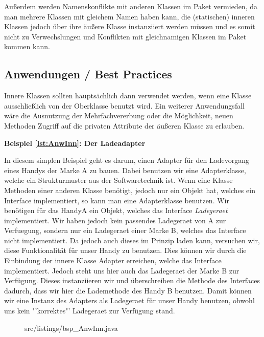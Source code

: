 Außerdem werden Namenskonflikte mit anderen Klassen im Paket vermieden, da man mehrere Klassen mit gleichem Namen haben kann,
die (statischen) inneren Klassen jedoch über ihre äußere Klasse instanziiert werden müssen und es somit nicht zu Verwechslungen und Konflikten mit gleichnamigen Klassen im Paket kommen kann.

\subsection{Anwendungen / Best Practices}

Innere Klassen sollten hauptsächlich dann verwendet werden, wenn eine Klasse ausschließlich von der Oberklasse benutzt wird.
Ein weiterer Anwendungsfall wäre die Ausnutzung der Mehrfachvererbung oder die Möglichkeit, neuen Methoden Zugriff auf die privaten Attribute der äußeren Klasse zu erlauben.

{\bf Beispiel \ref{lst:AnwInn}: Der Ladeadapter}

In diesem simplen Beispiel geht es darum, einen Adapter für den Ladevorgang eines Handys der Marke A zu bauen. Dabei benutzen wir eine Adapterklasse, welche ein Strukturmuster aus der Softwaretechnik ist. Wenn eine Klasse Methoden einer anderen Klasse benötigt, jedoch nur ein Objekt hat, welches ein Interface implementiert, so kann man eine Adapterklasse benutzen.
Wir benötigen für das HandyA ein Objekt, welches das Interface {\it Ladegeraet} implementiert.
Wir haben jedoch kein passendes Ladegeraet von A zur Verfuegung, sondern nur ein Ladegeraet einer Marke B, welches das Interface nicht implementiert.
Da jedoch auch dieses im Prinzip laden kann, versuchen wir, diese Funktionalität für unser Handy zu benutzen.
Dies können wir durch die Einbindung der innere Klasse Adapter erreichen, welche das Interface implementiert.
Jedoch steht uns hier auch das Ladegeraet der Marke B zur Verfügung.
Dieses instanziieren wir und überschreiben die Methode des Interfaces dadurch, dass wir hier die Lademethode des Handy B benutzen.
Damit können wir eine Instanz des Adapters als Ladegeraet für unser Handy benutzen, obwohl uns kein "'korrektes"' Ladegeraet zur Verfügung stand.
\\
\begin{figure}[hb]
\lstset{language=Java}
 {src/listings/bsp_AnwInn.java}
\end{figure}


\newpage
